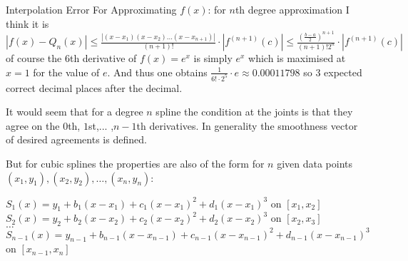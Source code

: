 Interpolation Error For Approximating $f(x)$: for $n$th degree approximation I think it is $|f(x)-Q_n(x)| \le \frac{|(x-x_1)(x-x_2) \dots (x-x_{n+1})|}{(n+1)!} \cdot |f^{(n+1)}(c)| \le \frac{\left( \frac{b-a}{2} \right)^{n+1}}{(n+1)! 2^n} \cdot |f^{(n+1)}(c)|$ of course the $6$th derivative of $f(x)=e^x$ is simply $e^x$ which is maximised at $x=1$ for the value of $e$. And thus one obtains $\frac{1}{6! \cdot 2^5} \cdot e \approx 0.00011798$ so $3$ expected correct decimal places after the decimal.

It would seem that for a degree $n$ spline the condition at the joints is that they agree on the $0$th, $1$st,... ,$n-1$th derivatives. In generality the smoothness vector of desired agreements is defined.

But for cubic splines the properties are also of the form for $n$ given data points $(x_1,y_1),(x_2,y_2),\dots,(x_n,y_n)$:

$S_1(x)=y_1+b_1(x-x_1)+c_1(x-x_1)^2+d_1 (x-x_1)^3$ on $[x_1,x_2]$ \\
$S_2(x)=y_2+b_2(x-x_2)+c_2(x-x_2)^2+d_2 (x-x_2)^3$ on $[x_2,x_3]$ \\
$\dots $ \\
$S_{n-1}(x)=y_{n-1}+b_{n-1}(x-x_{n-1})+c_{n-1}(x-x_{n-1})^2+d_{n-1}(x-x_{n-1})^3$ on $[x_{n-1},x_n]$